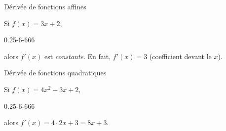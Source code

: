 \documentclass{beamer}
\begin{document}
\begin{frame}
    {Dérivée de fonctions affines}

    Si $f(x) = 3x + 2$,
    \begin{plot}
        {0.25}{-6}{-6}{6}{6}
    \end{plot}
    \pause{}
    alors $f'(x)$ est \emph{constante}.
    \pause{}
    En fait, $f'(x) = 3$ (coefficient devant le $x$).
\end{frame}

\begin{frame}
    {Dérivée de fonctions quadratiques}

    Si $f(x) = 4 x^2 + 3x + 2$,
    \begin{plot}
        {0.25}{-6}{-6}{6}{6}
    \end{plot}
    \pause{}
    alors $f'(x) = 4 \cdot 2 x + 3 = 8 x + 3$.
\end{frame}
\end{document}
